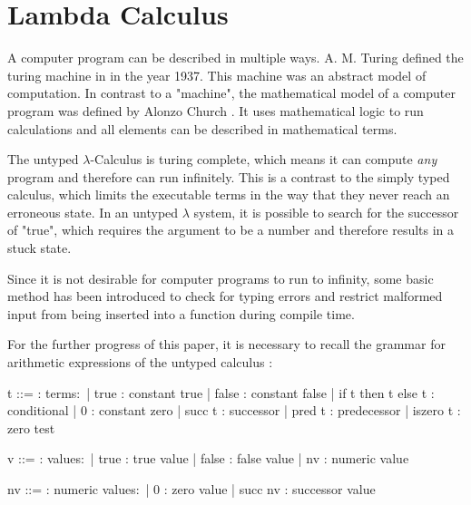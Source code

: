 \section{Lambda Calculus}

A computer program can be described in multiple
ways. A. M. Turing defined the turing machine
in \cite{aturingMachine} in the year 1937. This
machine was an abstract model of computation.
In contrast to a "machine", the mathematical model
of a computer program was defined by Alonzo Church
\cite{churchLambda}. It uses mathematical logic
to run calculations and all elements can be described
in mathematical terms.

The untyped $\lambda$-Calculus is turing complete,
which means it can compute \textit{any} program and
therefore can run infinitely. This is a contrast to
the simply typed calculus, which limits the executable
terms in the way that they never reach an erroneous state.
In an untyped $\lambda$ system, it is possible to search
for the successor of "true", which
requires the argument to be a number and therefore
results in a stuck state.

Since it is not desirable for computer programs to run to infinity,
some basic method has been introduced \cite{churchLogic} to check for typing errors
and restrict malformed input from being inserted into a function
during compile time.


For the further progress of this paper, it is necessary to recall
the grammar for arithmetic expressions of the untyped calculus \cite{pierce2002ProgLang}:

\begin{bnfgrammar}
    t ::= : terms$\colon$
    | true : constant true
    | false : constant false
    | if t then t else t : conditional
    | 0 : constant zero
    | succ t : successor
    | pred t : predecessor
    | iszero t : zero test
\end{bnfgrammar}

\begin{bnfgrammar}
    v ::= : values$\colon$
    | true : true value
    | false : false value
    | nv : numeric value
\end{bnfgrammar}

\begin{bnfgrammar}
    nv ::= : numeric values$\colon$
    | 0 : zero value
    | succ nv : successor value
\end{bnfgrammar}


